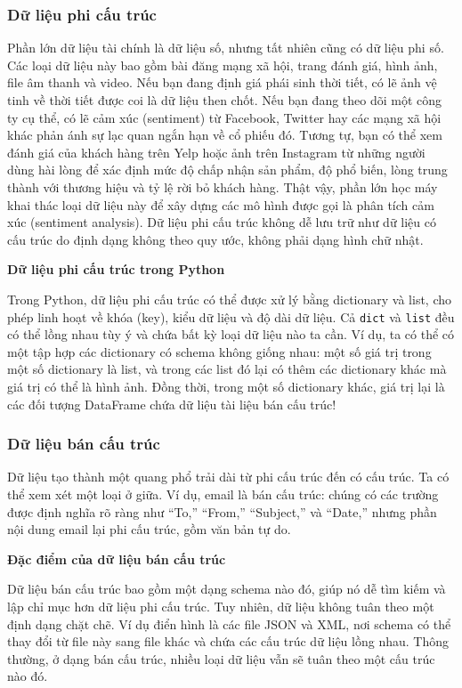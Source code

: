 \subsubsection{Dữ liệu phi cấu trúc}

Phần lớn dữ liệu tài chính là dữ liệu số, nhưng tất nhiên cũng có dữ liệu phi số. Các loại dữ liệu này bao gồm bài đăng mạng xã hội, trang đánh giá, hình ảnh, file âm thanh và video. Nếu bạn đang định giá phái sinh thời tiết, có lẽ ảnh vệ tinh về thời tiết được coi là dữ liệu then chốt. Nếu bạn đang theo dõi một công ty cụ thể, có lẽ cảm xúc (sentiment) từ Facebook, Twitter hay các mạng xã hội khác phản ánh sự lạc quan ngắn hạn về cổ phiếu đó. Tương tự, bạn có thể xem đánh giá của khách hàng trên Yelp hoặc ảnh trên Instagram từ những người dùng hài lòng để xác định mức độ chấp nhận sản phẩm, độ phổ biến, lòng trung thành với thương hiệu và tỷ lệ rời bỏ khách hàng. Thật vậy, phần lớn học máy khai thác loại dữ liệu này để xây dựng các mô hình được gọi là phân tích cảm xúc (sentiment analysis). Dữ liệu phi cấu trúc không dễ lưu trữ như dữ liệu có cấu trúc do định dạng không theo quy ước, không phải dạng hình chữ nhật.

\textbf{Dữ liệu phi cấu trúc trong Python}

Trong Python, dữ liệu phi cấu trúc có thể được xử lý bằng dictionary và list, cho phép linh hoạt về khóa (key), kiểu dữ liệu và độ dài dữ liệu. Cả \texttt{dict} và \texttt{list} đều có thể lồng nhau tùy ý và chứa bất kỳ loại dữ liệu nào ta cần. Ví dụ, ta có thể có một tập hợp các dictionary có schema không giống nhau: một số giá trị trong một số dictionary là list, và trong các list đó lại có thêm các dictionary khác mà giá trị có thể là hình ảnh. Đồng thời, trong một số dictionary khác, giá trị lại là các đối tượng DataFrame chứa dữ liệu tài liệu bán cấu trúc!

\subsubsection{Dữ liệu bán cấu trúc}

Dữ liệu tạo thành một quang phổ trải dài từ phi cấu trúc đến có cấu trúc. Ta có thể xem xét một loại ở giữa. Ví dụ, email là bán cấu trúc: chúng có các trường được định nghĩa rõ ràng như ``To,'' ``From,'' ``Subject,'' và ``Date,'' nhưng phần nội dung email lại phi cấu trúc, gồm văn bản tự do.

\textbf{Đặc điểm của dữ liệu bán cấu trúc}

Dữ liệu bán cấu trúc bao gồm một dạng schema nào đó, giúp nó dễ tìm kiếm và lập chỉ mục hơn dữ liệu phi cấu trúc. Tuy nhiên, dữ liệu không tuân theo một định dạng chặt chẽ. Ví dụ điển hình là các file JSON và XML, nơi schema có thể thay đổi từ file này sang file khác và chứa các cấu trúc dữ liệu lồng nhau. Thông thường, ở dạng bán cấu trúc, nhiều loại dữ liệu vẫn sẽ tuân theo một cấu trúc nào đó.


